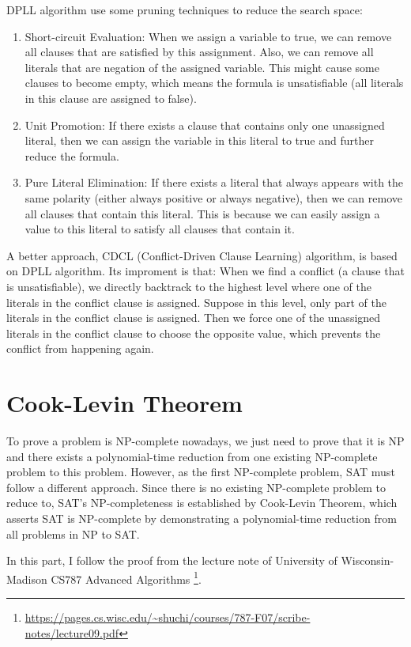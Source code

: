 \documentclass[a4paper,12pt]{article}
\begin{document}
\vspace{0.5cm}
DPLL algorithm use some pruning techniques to reduce the search space:
\begin{enumerate}
	\item Short-circuit Evaluation: When we assign a variable to true, we can remove all clauses that are satisfied by this assignment.
		Also, we can remove all literals that are negation of the assigned variable.
		This might cause some clauses to become empty, which means the formula is unsatisfiable (all literals in this clause are assigned to false).
	\item Unit Promotion: If there exists a clause that contains only one unassigned literal, then we can assign the variable in this literal to true and further reduce the formula.
	\item Pure Literal Elimination: If there exists a literal that always appears with the same polarity (either always positive or always negative), then we can remove all clauses that contain this literal.
		This is because we can easily assign a value to this literal to satisfy all clauses that contain it.
\end{enumerate}

A better approach, CDCL (Conflict-Driven Clause Learning) algorithm, is based on DPLL algorithm.
Its improment is that: When we find a conflict (a clause that is unsatisfiable), we directly backtrack to the highest level where one of the literals in the conflict clause is assigned.
Suppose in this level, only part of the literals in the conflict clause is assigned.
Then we force one of the unassigned literals in the conflict clause to choose the opposite value, which prevents the conflict from happening again.

\section{Cook-Levin Theorem}

To prove a problem is NP-complete nowadays, we just need to prove that it is NP and there exists a polynomial-time reduction from one existing NP-complete problem to this problem.
However, as the first NP-complete problem, SAT must follow a different approach.
Since there is no existing NP-complete problem to reduce to, SAT's NP-completeness is established by Cook-Levin Theorem, which asserts SAT is NP-complete by demonstrating a polynomial-time reduction from all problems in NP to SAT.

In this part, I follow the proof from the lecture note of University of Wisconsin-Madison CS787 Advanced Algorithms \footnote{\url{https://pages.cs.wisc.edu/~shuchi/courses/787-F07/scribe-notes/lecture09.pdf}}.
\end{document}
